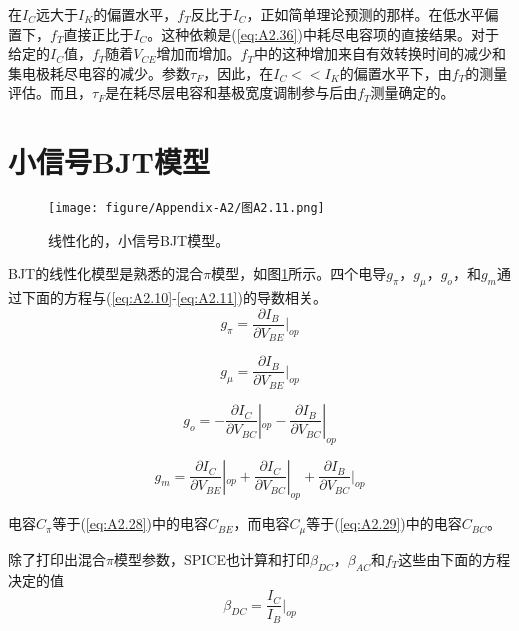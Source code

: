 在$I_C$远大于$I_K$的偏置水平，$f_T$反比于$I_C$，正如简单理论\cite{ref-88}预测的那样。在低水平偏置下，$f_T$直接正比于$I_C$。这种依赖是(\ref{eq:A2.36})中耗尽电容项的直接结果。对于给定的$I_C$值，$f_T$随着$V_{CE}$增加而增加。$f_T$中的这种增加来自有效转换时间的减少和集电极耗尽电容的减少。参数$\tau_F$，因此，在$I_C << I_K$的偏置水平下，由$f_T$的测量评估。而且，$\tau_F$是在耗尽层电容和基极宽度调制参与后由$f_T$测量确定的。

\section{小信号BJT模型}
\begin{figure}[htbp]
\small
    \centering
    \texttt{[image: figure/Appendix-A2/图A2.11.png]}
    \caption{线性化的，小信号BJT模型。}
    \label{图A2.11}
\end{figure}

BJT的线性化模型是熟悉的混合$\pi$模型\cite{ref-4}，如图\ref{图A2.11}所示。四个电导$g_{\pi}$，$g_{\mu}$，$g_o$，和$g_m$通过下面的方程与(\ref{eq:A2.10}-\ref{eq:A2.11})的导数相关。
\begin{equation}
    g_{\pi} = \frac{\partial I_B}{\partial V_{BE}}|_{op}
    \label{eq:A2.37}
\end{equation}

\begin{equation}
    g_{\mu} = \frac{\partial I_B}{\partial V_{BE}}|_{op}
    \label{eq:A2.38}
\end{equation}

\begin{equation}
    g_o = -\frac{\partial I_C}{\partial V_{BC}}|_{op} - \frac{\partial I_B}{\partial V_{BC}}|_{op}
    \label{eq:A2.39}
\end{equation}

\begin{equation}
    g_m = \frac{\partial I_C}{\partial V_{BE}}|_{op} + \frac{\partial I_C}{\partial V_{BC}}|_{op} + \frac{\partial I_B}{\partial V_{BC}}|_{op}
    \label{eq:A2.40}
\end{equation}

电容$C_{\pi}$等于(\ref{eq:A2.28})中的电容$C_{BE}$，而电容$C_{\mu}$等于(\ref{eq:A2.29})中的电容$C_{BC}$。

除了打印出混合$\pi$模型参数，SPICE也计算和打印$\beta_{DC}$，$\beta_{AC}$和$f_{T}$这些由下面的方程决定的值
\begin{equation}
    \beta_{DC} = \frac{I_C}{I_B}|_{op}
    \label{eq:A2.41}
\end{equation}

